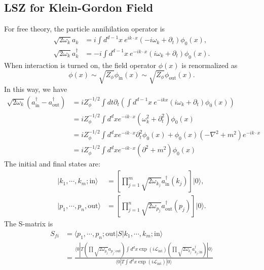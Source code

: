 \subsection{LSZ for Klein-Gordon Field}
For free theory, the particle annihilation operator is
\begin{equation}
\begin{aligned}
	\sqrt{2\omega_k} a_k &= i \int d^{d-1} x\ e^{ik\cdot x}(-i\omega_k+\partial_t)\phi_0(x), \\
	\sqrt{2\omega_k} a^\dagger_k &= -i \int d^{d-1} x\ e^{-ik\cdot x}(i\omega_k+\partial_t)\phi_0(x).
\end{aligned}
\end{equation}
When interaction is turned on, the field operator $\phi(x)$ is renormalized as
\begin{equation*}
	\phi(x) \sim \sqrt{Z_{\phi}} \phi_{\mathrm{in}}(x) \sim \sqrt{Z_{\phi}} \phi_{\mathrm{out}}(x).
\end{equation*}
In this way, we have
\begin{equation*}
\begin{aligned}
	\sqrt{2\omega_k}(a_{\mathrm{in}}^\dagger - a_{\mathrm{out}}^\dagger)
	&= i Z_\phi^{-1/2} \int dt \partial_t \left(\int d^{d-1}x\ e^{-ikx}(i\omega_k+\partial_t)\phi_0(x)\right) \\
	&= i Z_\phi^{-1/2} \int d^d x e^{-ik\cdot x}(\omega_k^2+\partial_t^2)\phi_0(x) \\
	&= i Z_\phi^{-1/2} \int d^d x e^{-ik\cdot x}\partial_t^2\phi_0(x) + \phi_0(x)(-\nabla^2+m^2)e^{-i k\cdot x} \\
	&= i Z_\phi^{-1/2} \int d^d x e^{-ik\cdot x}(\partial^2+m^2)\phi_0(x)
\end{aligned}
\end{equation*}
The initial and final states are:
\begin{equation}
\begin{aligned}
	|k_1, \cdots, k_m; \mathrm{in}\rangle &= \left[\prod_{j=1}^m \sqrt{2\omega_{k_j}} a^\dagger_{\mathrm{in}}(k_j)\right] |0\rangle, \\
	|p_1, \cdots, p_n, \mathrm{out}\rangle &= \left[\prod_{j=1}^n \sqrt{2\omega_{p_j}}a^\dagger_{\mathrm{out}}(p_j)\right] |0\rangle.
\end{aligned}
\end{equation}
The S-matrix is
\begin{equation*}
\begin{aligned}
	S_{fi} &= \langle p_1, \cdots, p_n;\mathrm{out}| S |k_1, \cdots, k_m; \mathrm{in}\rangle \\
	&= \frac{\langle 0|T 
		\left(\prod \sqrt{2\omega_{p_j}} a_{p_j;\mathrm{out}} \right)
		\int d^dx \exp(i\mathcal{L}_{\mathrm{int}})
		\left(\prod \sqrt{2\omega_{k_j}} a^\dagger_{k_j;\mathrm{in}} \right)|0\rangle}
		{\langle 0|T\int d^dx \exp(i\mathcal{L}_{\mathrm{int}})|0\rangle}
\end{aligned}
\end{equation*}
